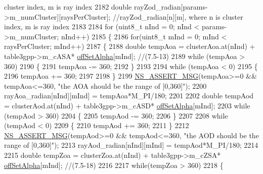 \begin{DoxyCode}
{       cluster index, m is ray index}
2182         \textcolor{keywordtype}{double} rayZod\_radian[params->m\_numCluster][raysPerCluster]; \textcolor{comment}{//rayZod\_radian[n][m], where n is
       cluster index, m is ray index}
2183 
2184         \textcolor{keywordflow}{for} (uint8\_t nInd = 0; nInd < params->m\_numCluster; nInd++)
2185         \{
2186                 \textcolor{keywordflow}{for}(uint8\_t mInd = 0; mInd < raysPerCluster; mInd++)
2187                 \{
2188                         \textcolor{keywordtype}{double} tempAoa = clusterAoa.at(nInd) + table3gpp->m\_cASA*
      \hyperlink{namespacens3_a2344173eeb094a196c555a159e87bc6f}{offSetAlpha}[mInd]; \textcolor{comment}{//(7.5-13)}
2189                         \textcolor{keywordflow}{while} (tempAoa > 360)
2190                         \{
2191                                 tempAoa -= 360;
2192                         \}
2193 
2194                         \textcolor{keywordflow}{while} (tempAoa < 0)
2195                         \{
2196                                 tempAoa += 360;
2197 
2198                         \}
2199                         \hyperlink{assert_8h_aff5ece9066c74e681e74999856f08539}{NS\_ASSERT\_MSG}(tempAoa>=0 && tempAoa<=360, \textcolor{stringliteral}{"the AOA should be the range
       of [0,360]"});
2200                         rayAoa\_radian[nInd][mInd] = tempAoa*M\_PI/180;
2201 
2202                         \textcolor{keywordtype}{double} tempAod = clusterAod.at(nInd) + table3gpp->m\_cASD*
      \hyperlink{namespacens3_a2344173eeb094a196c555a159e87bc6f}{offSetAlpha}[mInd];
2203                         \textcolor{keywordflow}{while} (tempAod > 360)
2204                         \{
2205                                 tempAod -= 360;
2206                         \}
2207 
2208                         \textcolor{keywordflow}{while} (tempAod < 0)
2209                         \{
2210                                 tempAod += 360;
2211                         \}
2212                         \hyperlink{assert_8h_aff5ece9066c74e681e74999856f08539}{NS\_ASSERT\_MSG}(tempAod>=0 && tempAod<=360, \textcolor{stringliteral}{"the AOD should be the range
       of [0,360]"});
2213                         rayAod\_radian[nInd][mInd] = tempAod*M\_PI/180;
2214 
2215                         \textcolor{keywordtype}{double} tempZoa = clusterZoa.at(nInd) + table3gpp->m\_cZSA*
      \hyperlink{namespacens3_a2344173eeb094a196c555a159e87bc6f}{offSetAlpha}[mInd]; \textcolor{comment}{//(7.5-18)}
2216 
2217                         \textcolor{keywordflow}{while}(tempZoa > 360)
2218                         \{

\end{DoxyCode}
